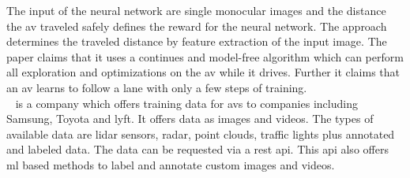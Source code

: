 The input of the neural network are single monocular images and the distance the \gls{av} traveled safely defines the reward for the neural network.
The approach determines the traveled distance by feature extraction of the input image.
The paper claims that it uses a continues and model-free algorithm which can perform all exploration and optimizations on the \gls{av} while it drives.
Further it claims that an \gls{av} learns to follow a lane with only a few steps of training.\\
\scaleai{}~\cite{scaleAI} is a company which offers training data for \glspl{av} to companies including Samsung, Toyota and lyft.
It offers data as images and videos.
The types of available data are \gls{lidar} sensors, radar, point clouds, traffic lights plus annotated and labeled data.
The data can be requested via a \gls{rest} \gls{api}.
This \gls{api} also offers \gls{ml} based methods to label and annotate custom images and videos.
